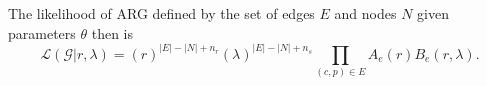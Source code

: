\documentclass{article}
\newcommand{\comment}[1]{{\it \color{orange} (#1)}}
\begin{document}


The likelihood of ARG defined by the set of edges $E$ and nodes $N$
given parameters $\theta$ then is
\begin{equation}\label{eq:full-lik}
    \mathcal{L}(\mathcal{G}|r, \lambda)
    =
    (r)^{|E|-|N|+n_r} (\lambda)^{|E|-|N|+n_s} \prod_{(c, p) \in E} A_e(r) B_e(r, \lambda) .
\end{equation}

\end{document}
